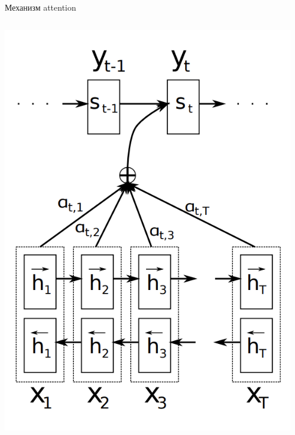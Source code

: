 \documentclass[11pt,aspectratio=169,handout]{beamer}
\begin{document}
\begin{frame}{Механизм attention \cite{NMT}}

\begin{columns}
\begin{column}{0.45\textwidth} 
\begin{center}
\includegraphics[scale=0.3]{images/nmt-arch.png}
\end{center}
\end{column}
\begin{column}{0.45\textwidth}
\begin{center}

\end{center}
\end{column}
\end{columns}
\end{frame}
\end{document}
